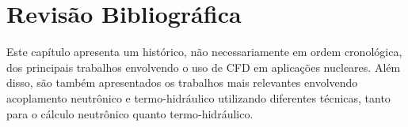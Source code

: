 \chapter{Revisão Bibliográfica}
\label{chap:rev}

Este capítulo apresenta um histórico, não necessariamente em ordem
cronológica, dos principais trabalhos envolvendo
o uso de CFD em aplicações nucleares. Além disso, são também apresentados
os trabalhos mais relevantes envolvendo acoplamento neutrônico e
termo-hidráulico utilizando diferentes técnicas, tanto para o cálculo neutrônico
quanto termo-hidráulico.

%




